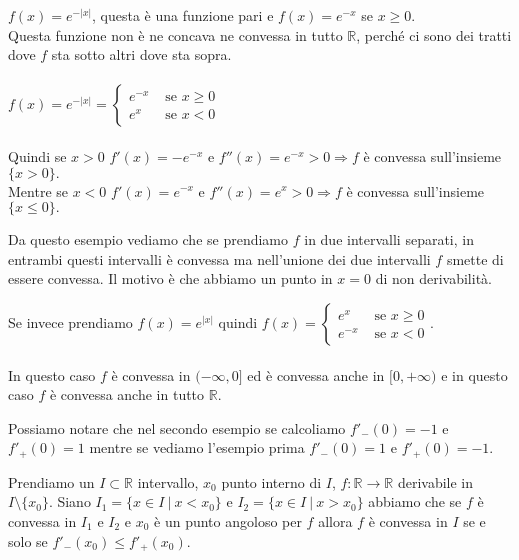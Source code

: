 \begin{example}
$f(x) = e^{-|x|}$, questa è una funzione pari e $f(x) = e^{-x}$ se $x \geq 0$.\\
Questa funzione non è ne concava ne convessa in tutto $\mathbb{R}$, perché ci sono dei tratti dove $f$ sta sotto altri dove sta sopra.\\\\
$f(x) = e^{-|x|} = \begin{cases}e^{-x} & \text{ se } x\geq 0\\e^{x} & \text{ se } x < 0\end{cases}$ \\\\
Quindi se $x>0$ $f'(x) = -e^{-x}$ e $f''(x) = e^{-x} > 0 \Longrightarrow f$ è convessa sull'insieme $\{x>0\}.$\\
Mentre se $x<0$ $f'(x) = e^{-x}$ e $f''(x) = e^{x} > 0 \Longrightarrow f$ è convessa sull'insieme $\{x\leq0\}.$
\end{example}
\hspace{-15pt}Da questo esempio vediamo che se prendiamo $f$ in due intervalli separati, in entrambi questi intervalli è convessa ma nell'unione dei due intervalli $f$ smette di essere convessa. Il motivo è che abbiamo un punto in $x=0$ di non derivabilità.

\begin{example}
Se invece prendiamo $f(x) = e^{|x|}$ quindi $f(x) = \begin{cases}e^x & \text{ se } x\geq 0 \\e^{-x} & \text{ se } x< 0 \end{cases}$.\\\\
In questo caso $f$ è convessa in $(-\infty, 0]$ ed è convessa anche in $[0, +\infty)$ e in questo caso $f$ è convessa anche in tutto $\mathbb{R}$.
\end{example}

\hspace{-15pt}Possiamo notare che nel secondo esempio se calcoliamo $f'_-(0) = -1$ e $f'_+(0) = 1$ mentre se vediamo l'esempio prima $f'_-(0) = 1$ e $f'_+(0) = -1$.

\begin{proposition}
Prendiamo un $I \subset \mathbb{R}$ intervallo, $x_0$ punto interno di $I$, $f:\mathbb{R} \to \mathbb{R}$ derivabile in $I \setminus \{x_0\}$. Siano $I_1 = \{x \in I \: |\: x<x_0\}$ e $I_2 = \{x\in I \: |\: x > x_0\}$ abbiamo che se $f$ è convessa in $I_1$ e $I_2$ e $x_0$ è un punto angoloso per $f$ allora $f$ è convessa in $I$ se e solo se $f'_-(x_0) \leq f'_+(x_0)$.
\end{proposition}

